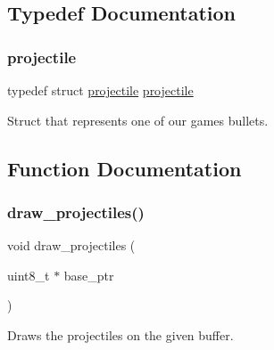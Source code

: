\subsection{Typedef Documentation}
\mbox{\label{group__projectiles_ga0ecdecffd31e7e21a2db68fb1aef8f23}} 
\subsubsection{\texorpdfstring{projectile}{projectile}}
{\footnotesize\ttfamily typedef struct \hyperlink{structprojectile}{projectile}  \hyperlink{structprojectile}{projectile}}



Struct that represents one of our game\textquotesingle{}s bullets. 



\subsection{Function Documentation}
\mbox{\label{group__projectiles_gae77390eb18c5b9c31165e891a1ab4b19}} 
\subsubsection{\texorpdfstring{draw\+\_\+projectiles()}{draw\_projectiles()}}
{\footnotesize\ttfamily void draw\+\_\+projectiles (\begin{DoxyParamCaption}\item[{uint8\+\_\+t $\ast$}]{base\+\_\+ptr }\end{DoxyParamCaption})}



Draws the projectiles on the given buffer. 


